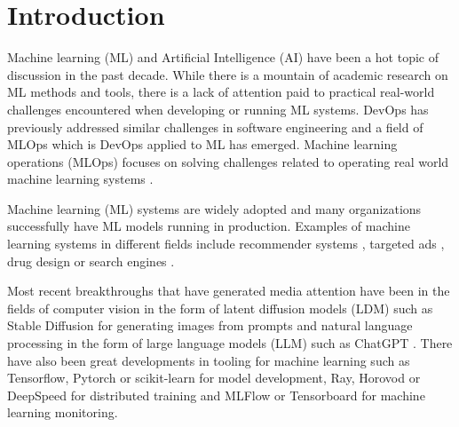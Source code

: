 \chapter{Introduction}
\label{chap:intro}



Machine learning (ML) and Artificial Intelligence (AI) have been a hot topic of discussion in the past decade. While there is a mountain of academic research on ML methods and tools, there is a lack of attention paid to practical real-world challenges encountered when developing or running ML systems. DevOps has previously addressed similar challenges in software engineering and a field of MLOps which is DevOps applied to ML has emerged. Machine learning operations (MLOps) focuses on solving challenges related to operating real world machine learning systems \parencite{kreuzbergerMachineLearningOperations2023}.

Machine learning (ML) systems are widely adopted and many organizations successfully have ML models running in production.
Examples of machine learning systems in different fields include recommender systems , targeted ads \parencite{domingosFewUsefulThings2012}, drug design \parencite{domingosFewUsefulThings2012} or search engines \parencite{domingosFewUsefulThings2012}.

Most recent breakthroughs that have generated media attention have been in the fields of computer vision in the form of latent diffusion models (LDM) \parencite{rombachHighResolutionImageSynthesis2022} such as Stable Diffusion \parencite{stabilityaiStableDiffusionPublic2022} for generating images from prompts and natural language processing in the form of large language models (LLM) \parencite{touvronLLaMAOpenEfficient2023} such as ChatGPT \parencite{openaiIntroducingChatGPT2022}. There have also been great developments in tooling for machine learning such as Tensorflow, Pytorch or scikit-learn  for model development, Ray, Horovod or DeepSpeed  for distributed training and MLFlow or Tensorboard  for machine learning monitoring.



